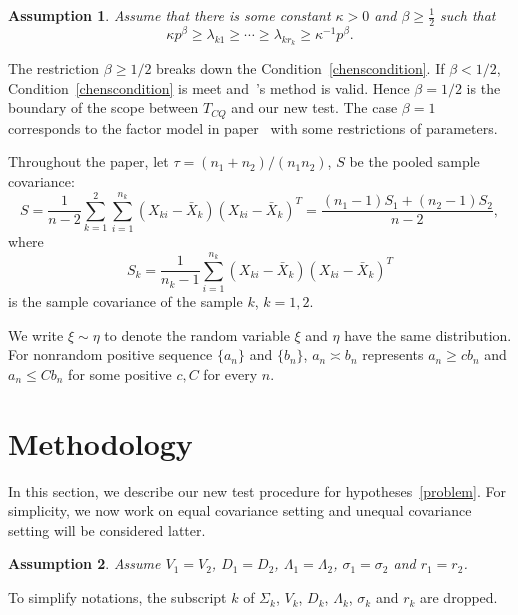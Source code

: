 \documentclass[review]{elsarticle}
\theoremstyle{plain}
\newtheorem{assumption}{\quad\quad Assumption}
\theoremstyle{definition}
\theoremstyle{remark}
\begin{document}
\begin{assumption}\label{orderOfBeta}
    Assume that there is some constant $\kappa>0$ and $\beta\geq \frac{1}{2}$ such that
    \begin{equation*}
        \kappa p^{\beta}\geq \lambda_{k1}\geq \cdots \geq\lambda_{kr_k}\geq \kappa^{-1}p^{\beta}.
\end{equation*}
\end{assumption}


The restriction $\beta\geq 1/2$ breaks down the Condition~\eqref{chenscondition}. If $\beta< 1/2$, Condition~\eqref{chenscondition} is meet and~\cite{Chen2010A}'s  method is valid. 
 Hence $\beta=1/2$ is the boundary of the scope between $T_{CQ}$ and our new test.
The case $\beta=1$ corresponds to the factor model in paper~\cite{Ma2015A} with some restrictions of parameters.

Throughout the paper, let $\tau={(n_1+n_2)}/{(n_1n_2)}$, $S$ be the pooled sample covariance:
\begin{equation*}
S=\frac{1}{n-2}\sum_{k=1}^2\sum_{i=1}^{n_k} (X_{ki}-\bar{X}_k) {(X_{ki}-\bar{X}_k)}^T
    =\frac{(n_1-1)S_1+(n_2-1)S_2}{n-2},
\end{equation*}
where
\begin{equation*}
S_k=\frac{1}{n_k -1}\sum_{i=1}^{n_k} (X_{ki}-\bar{X}_k) {(X_{ki}-\bar{X}_k)}^T
\end{equation*}
is the sample covariance  of the sample $k$, $k=1,2$.

We write $\xi\sim \eta$ to denote the random variable $\xi$ and $\eta$ have the same distribution.
For nonrandom positive sequence $\{a_n\}$ and $\{b_n\}$, $a_n\asymp b_n$ represents $a_n\geq cb_n$ and $a_n\leq Cb_n$ for some positive $c,C$ for every $n$.

\section{Methodology}

In this section, we describe our new test procedure for hypotheses~\eqref{problem}. For simplicity, we now work on equal covariance setting and unequal covariance setting will be considered latter.
\begin{assumption}\label{theModel2}
Assume $V_1=V_2$, $D_1=D_2$, $\Lambda_1=\Lambda_2$, $\sigma_1=\sigma_2$ and $r_1=r_2$.
\end{assumption}

To simplify notations, the subscript $k$ of $\Sigma_k$, $V_k$, $D_k$, $\Lambda_k$, $\sigma_k$ and $r_k$ are dropped.
\end{document}
